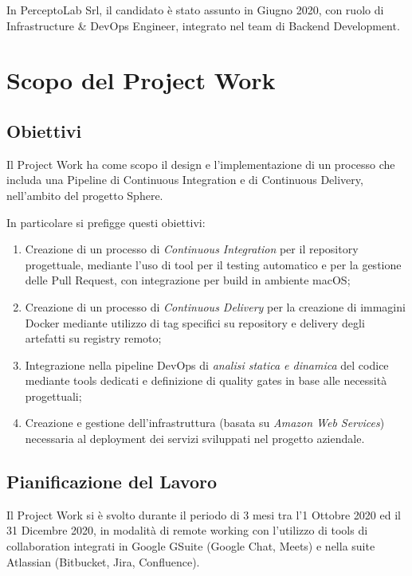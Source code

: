 \documentclass[a4paper,12pt]{report}
\begin{document}
			In PerceptoLab Srl, il candidato è stato assunto in Giugno 2020, con ruolo di Infrastructure \& DevOps Engineer,
			integrato nel team di Backend Development.
	
	\section{Scopo del Project Work}
	
		\subsection{Obiettivi}
	
			Il Project Work ha come scopo il design e l'implementazione di un processo che includa una Pipeline di Continuous
			Integration e di Continuous Delivery, nell'ambito del progetto Sphere.
			
			In particolare si prefigge questi obiettivi:
			\begin{enumerate}
				\item Creazione di un processo di \emph{Continuous Integration} per il repository progettuale, mediante l'uso di tool per il testing automatico e per la gestione delle Pull Request, con integrazione per build in ambiente macOS;
				\item Creazione di un processo di \emph{Continuous Delivery} per la creazione di immagini Docker mediante utilizzo di tag specifici su repository e delivery degli artefatti su registry remoto;
				\item Integrazione nella pipeline DevOps di \emph{analisi statica e dinamica} del codice mediante tools dedicati e definizione di quality gates in base alle necessità progettuali;
				\item Creazione e gestione dell'infrastruttura (basata su \emph{Amazon Web Services}) necessaria al deployment dei servizi sviluppati nel progetto aziendale.
			\end{enumerate}
	
		\subsection{Pianificazione del Lavoro}
	
			Il Project Work si è svolto durante il periodo di 3 mesi tra l'1 Ottobre 2020 ed il 31 Dicembre 2020, in modalità di remote
			working con l'utilizzo di tools di collaboration integrati in Google GSuite (Google Chat, Meets) e nella suite Atlassian
			(Bitbucket, Jira, Confluence).
			
\end{document}
